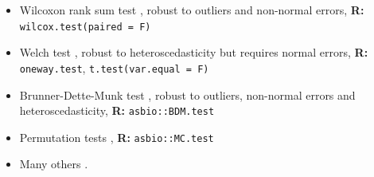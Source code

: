 \documentclass[12pt,english]{article}\usepackage[]{graphicx}\usepackage[table]{xcolor}
\begin{document}
\begin{small}
\begin{itemize}
\item Wilcoxon rank sum test \citep{wilcoxon1945}, robust to outliers and non-normal errors, \textbf{R:} \texttt{wilcox.test(paired = F)}\vspace{-.1in}
\item Welch test \citep{welch1951}, robust to heteroscedasticity but requires normal errors, \textbf{R:} \texttt{oneway.test}, \texttt{t.test(var.equal = F)}\vspace{-.1in}
\item Brunner-Dette-Munk test \citep{brunner1997}, robust to outliers, non-normal errors and heteroscedasticity, \textbf{R:} \texttt{asbio::BDM.test}\vspace{-.1in}
\item Permutation tests \citep[see][]{manly2006}, \textbf{R:} \texttt{asbio::MC.test}
\item Many others \citep[see][]{wilcox2012, hollander2013}.
\end{itemize}
\end{small}
\vspace{0.1in}
\end{document}
